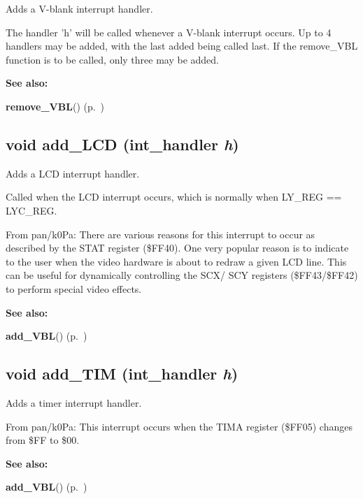 Adds a V-blank interrupt handler.

The handler 'h' will be called whenever a V-blank interrupt occurs. Up to 4 handlers may be added, with the last added being called last. If the remove\_\-VBL function is to be called, only three may be added. \begin{Desc}
\item[{\bf See also: }]\par
{\bf remove\_\-VBL}() {\rm (p.~\pageref{gb.h_a53})} \end{Desc}
\label{gb.h_a59}
\subsection{\setlength{\rightskip}{0pt plus 5cm}void add\_\-LCD ({\bf int\_\-handler} {\em h})}

Adds a LCD interrupt handler.

Called when the LCD interrupt occurs, which is normally when LY\_\-REG == LYC\_\-REG.

From pan/k0Pa: There are various reasons for this interrupt to occur as described by the STAT register (\$FF40). One very popular reason is to indicate to the user when the video hardware is about to redraw a given LCD line. This can be useful for dynamically controlling the SCX/ SCY registers (\$FF43/\$FF42) to perform special video effects.

\begin{Desc}
\item[{\bf See also: }]\par
{\bf add\_\-VBL}() {\rm (p.~\pageref{gb.h_a58})} \end{Desc}
\label{gb.h_a60}
\subsection{\setlength{\rightskip}{0pt plus 5cm}void add\_\-TIM ({\bf int\_\-handler} {\em h})}

Adds a timer interrupt handler.

From pan/k0Pa: This interrupt occurs when the TIMA register (\$FF05) changes from \$FF to \$00.

\begin{Desc}
\item[{\bf See also: }]\par
{\bf add\_\-VBL}() {\rm (p.~\pageref{gb.h_a58})} \end{Desc}
\label{gb.h_a61}
